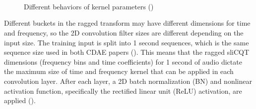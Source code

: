 \documentclass[report.tex]{subfiles}
\begin{document}
\begin{figure}[ht]
	\centering
	\\
	\\
	\\
	\caption{Different behaviors of kernel parameters (\cite[14, 29]{convguide})}
	\label{fig:convdiags}
\end{figure}

Different buckets in the ragged transform may have different dimensions for time and frequency, so the 2D convolution filter sizes are different depending on the input size. The training input is split into 1 second sequences, which is the same sequence size used in both CDAE papers (\cite{plumbley1, plumbley2}). This means that the ragged sliCQT dimensions (frequency bins and time coefficients) for 1 second of audio dictate the maximum size of time and frequency kernel that can be applied in each convolution layer. After each layer, a 2D batch normalization (BN) and nonlinear activation function, specifically the rectified linear unit (ReLU) activation, are applied (\cite{plumbley2}).
\end{document}
